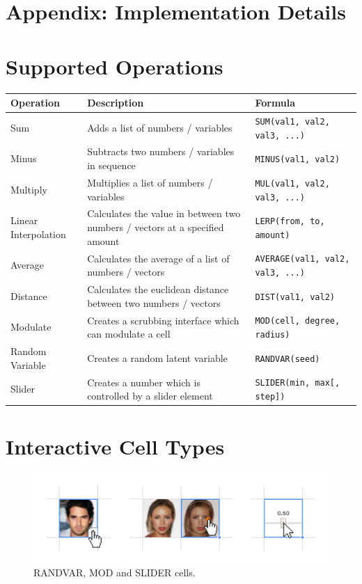 \documentclass[letterpaper]{article}
\begin{document}
\section*{Appendix: Implementation Details}

\section*{Supported Operations}

\renewcommand{\arraystretch}{1.5}

\begin{center}
    \begin{tabular}{ | l | p{6cm} | p{5.6cm} |}
    \hline \textbf{Operation} & \textbf{Description} & \textbf{Formula} \\ \hline
    Sum & Adds a list of numbers / variables  & \texttt{SUM(val1, val2, val3, ...)} \\ \hline
    Minus & Subtracts two numbers / variables in sequence  & \texttt{MINUS(val1, val2)} \\ \hline
    Multiply & Multiplies a list of numbers / variables  & \texttt{MUL(val1, val2, val3, ...)} \\ \hline
    Linear Interpolation & Calculates the value in between two numbers / vectors at a specified amount  & \texttt{LERP(from, to, amount)} \\ \hline
    Average & Calculates the average of a list of numbers / vectors  & \texttt{AVERAGE(val1, val2, val3, ...)} \\ \hline
    Distance & Calculates the euclidean distance between two numbers / vectors  & \texttt{DIST(val1, val2)} \\ \hline
    Modulate & Creates a scrubbing interface which can modulate a cell  & \texttt{MOD(cell, degree, radius)} \\ \hline
    Random Variable & Creates a random latent variable  & \texttt{RANDVAR(seed)} \\ \hline
    Slider & Creates a number which is controlled by a slider element  & \texttt{SLIDER(min, max[, step])} \\ \hline
    \end{tabular}
\end{center}


\section*{Interactive Cell Types}

\begin{figure}[ht!]
  \centering
  \includegraphics[width=12cm]{figs/03-cell-types.jpg}
  \caption{RANDVAR, MOD and SLIDER cells.}
\end{figure}
\end{document}

